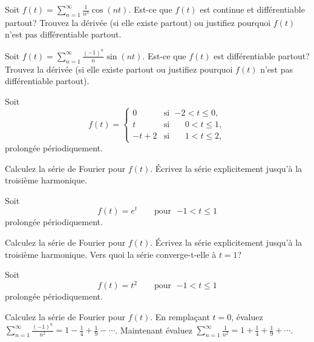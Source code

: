 \begin{exercise}
Soit  $f(t) = \sum_{n=1}^\infty \frac{1}{n^3} \cos (n t)$.  Est-ce que $f(t)$
est continue et différentiable partout? Trouvez la dérivée (si elle existe partout) ou justifiez pourquoi $f(t)$ n'est pas différentiable partout.
\end{exercise}

\begin{exercise}
Soit $f(t) = \sum_{n=1}^\infty \frac{{(-1)}^n}{n} \sin (n t)$.  Est-ce que  $f(t)$
est différentiable partout?  Trouvez la dérivée (si elle existe partout ou justifiez pourquoi $f(t)$ n'est pas différentiable partout).
\end{exercise}

\begin{exercise}
Soit
\begin{equation*}
f(t) =
\begin{cases}
0 & \text{si } \; {-2} < t \leq 0, \\
t & \text{si } \; \phantom{-}0 < t \leq 1, \\
-t+2 & \text{si } \; \phantom{-}1 < t \leq 2,
\end{cases}
\end{equation*}
prolongée périodiquement.
\begin{tasks}
\task Calculez la série de Fourier pour $f(t)$.
\task Écrivez la série explicitement jusqu'à la troisième harmonique.
\end{tasks}
\end{exercise}

\begin{exercise}
Soit
\begin{equation*}
f(t) = e^t \qquad \text{pour } \; {-1} < t \leq 1
\end{equation*}
prolongée périodiquement.
\begin{tasks}
\task Calculez la série de Fourier pour $f(t)$.
\task Écrivez la série explicitement jusqu'à la troisième harmonique.
\task Vers quoi la série converge-t-elle à $t=1$?
\end{tasks}
\end{exercise}

\begin{exercise}
Soit
\begin{equation*}
f(t) = t^2 \qquad \text{pour } \; {-1} < t \leq 1
\end{equation*}
prolongée périodiquement.
\begin{tasks}
\task Calculez la série de Fourier pour $f(t)$.
\task En remplaçant $t=0$,
évaluez $\displaystyle \sum_{n=1}^\infty \frac{{(-1)}^n}{n^2} = 1 - \frac{1}{4} +
\frac{1}{9} - \cdots$.
\task Maintenant évaluez $\displaystyle \sum_{n=1}^\infty \frac{1}{n^2} = 1 + \frac{1}{4} +
\frac{1}{9} + \cdots$.
\end{tasks}
\end{exercise}

